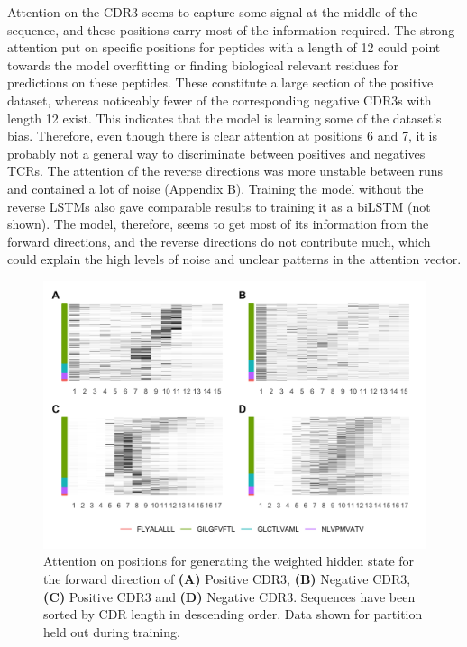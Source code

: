 Attention on the CDR3{\textbeta} seems to capture some signal at the middle of the sequence, and these positions carry most of the information required. The strong attention put on specific positions for peptides with a length of 12 could point towards the model overfitting or finding biological relevant residues for predictions on these peptides. These constitute a large section of the positive dataset, whereas noticeably fewer of the corresponding negative CDR3{\textbeta}s with length 12 exist. This indicates that the model is learning some of the dataset's bias. Therefore, even though there is clear attention at positions 6 and 7, it is probably not a general way to discriminate between positives and negatives TCRs.
The attention of the reverse directions was more unstable between runs and contained a lot of noise (Appendix B). Training the model without the reverse LSTMs also gave comparable results to training it as a biLSTM (not shown). The model, therefore, seems to get most of its information from the forward directions, and the reverse directions do not contribute much, which could explain the high levels of noise and unclear patterns in the attention vector.

\begin{figure}[H]
    \centering
    \includegraphics[width=\linewidth]{figures/attention_results/att_cdr3s.png}
    \caption{Attention on positions for generating the weighted hidden state for the forward direction of \textbf{(A)} Positive CDR3{\textalpha}, \textbf{(B)} Negative CDR3{\textalpha}, \textbf{(C)} Positive CDR3{\textbeta} and \textbf{(D)} Negative CDR3{\textbeta}. Sequences have been sorted by CDR length in descending order. Data shown for partition held out during training.}
    \label{fig:att_cdrs}
\end{figure}


